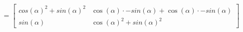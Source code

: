 \documentclass[preview]{standalone}
\begin{document}
\begin{align*}
=\begin{bmatrix} cos(\alpha)^2 + sin(\alpha)^2  & \cos(\alpha) \cdot -sin(\alpha) + \cos(\alpha) \cdot -sin(\alpha) \\ sin(\alpha) & \cos(\alpha)^2+  sin(\alpha)^2\end{bmatrix}
\end{align*}
\end{document}
